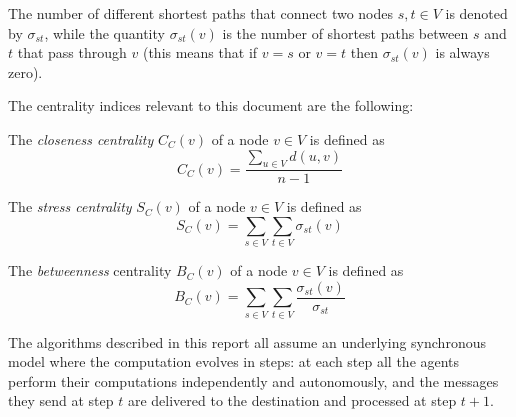 The number of different shortest paths that connect two nodes $s,t \in V$ is denoted by $\sigma_{st}$, while the quantity $\sigma_{st}(v)$ is the number of shortest paths between $s$ and $t$ that pass through $v$ (this means that if $v = s$ or $v = t$ then $\sigma_{st}(v)$ is always zero).

The centrality indices relevant to this document are the following:
\begin{defcc} The \emph{closeness centrality} $C_C(v)$ of a node $v \in V$ is defined as
\begin{equation}
 C_C(v) = \frac{\sum_{u \in V} d(u,v)}{n-1}
\end{equation}
\end{defcc}
\begin{defsc} The \emph{stress centrality} $S_C(v)$ of a node $v \in V$ is defined as
\begin{equation}
 S_C(v) = \sum_{s \in V} \sum_{t \in V} \sigma_{st}(v)
\end{equation}
\end{defsc}
\begin{defbc} The \emph{betweenness} centrality $B_C(v)$ of a node $v \in V$ is defined as
\begin{equation}
 B_C(v) = \sum_{s \in V} \sum_{t \in V} \frac{\sigma_{st}(v)}{\sigma_{st}}
\end{equation}
\end{defbc}

The algorithms described in this report all assume an underlying synchronous model where the computation evolves in steps: at each step all the agents perform their computations independently and autonomously, and the messages they send at step $t$ are delivered to the destination and processed at step $t+1$.